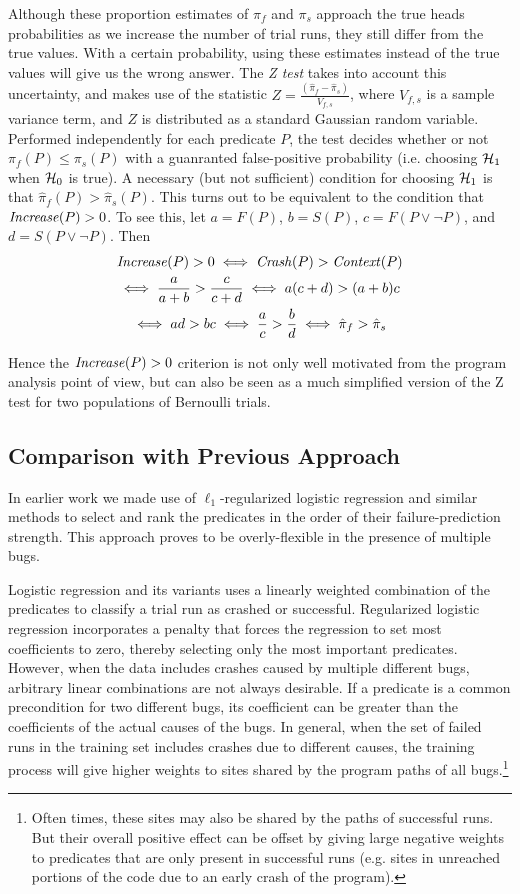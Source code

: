 Although these proportion estimates of $\pi_f$ and $\pi_s$ approach the
true heads probabilities as we increase the number of trial runs, they
still differ from the true values.  With a certain probability, using these
estimates instead of the true values will give us the wrong
answer.  The \textit{Z test} takes into account this uncertainty, and
makes use of the statistic $ Z = \frac{(\hat \pi_f - \hat
  \pi_s)}{V_{f,s}}$, where $V_{f,s}$ is a sample variance term, and $Z$
is distributed as a standard Gaussian random
variable.  Performed independently for each predicate $P$, the test
decides whether or not $\pi_f(P) \leq \pi_s(P)$ with a guanranted
false-positive probability (i.e. choosing ${\mathcal{H}}_1$ when ${\mathcal{H}}_0$ is true).
A necessary (but not sufficient) condition for choosing ${\mathcal{H}}_1$ is that
$\hat \pi_f(P) > \hat \pi_s(P)$.  This turns out to be
equivalent to the condition that $\mbox{\textit{Increase}}(P) > 0$.  To see this,
let $a = F(P)$, $b = S(P)$, $c = F(P\lor\lnot P)$, and $d = S(P\lor\lnot P)$.
Then
\begin{gather*}
  \mbox{\textit{Increase}}(P) > 0 \iff \mbox{\textit{Crash}}(P) > \mbox{\textit{Context}}(P) \\
  \iff \frac{a}{a+b} > \frac{c}{c+d}
  \iff a (c+d) > (a+b) c \\
  \iff ad > bc \iff \frac{a}{c} > \frac{b}{d}
  \iff \hat \pi_f > \hat \pi_s
\end{gather*}

Hence the $\mbox{\textit{Increase}}(P) > 0$ criterion is not only well motivated
from the program analysis point of view, but can also be seen as a much
simplified version of the Z test for two populations of
Bernoulli trials.

\subsection{Comparison with Previous Approach}
In earlier work \cite{PLDI`03*141,Zheng:2003:SDSP}
we made use of $\ell_1$-regularized logistic regression and similar
methods to select and rank the predicates in the order of their
failure-prediction strength.  This approach proves to be
overly-flexible in the presence of multiple bugs.

Logistic regression and its variants uses a linearly weighted
combination of the predicates to classify a trial run as crashed or
successful.  Regularized logistic regression incorporates a penalty
that forces the regression to set most coefficients to zero, thereby
selecting only the most important predicates.  However, when the data
includes crashes caused by multiple different bugs, arbitrary linear
combinations are not always desirable.  If a predicate is a
common precondition for two different bugs, its coefficient
can be greater than the coefficients of the actual causes of the bugs.
In general, when the set of failed runs in
the training set includes crashes due to different causes, the
training process will give higher weights to sites shared by the
program paths of all bugs.\footnote{Often times, these sites may also be
shared by the paths of successful runs.  But their overall positive
effect can be offset by giving large negative weights to predicates
that are only present in successful runs (e.g. sites in unreached
portions of the code due to an early crash of the program).}

